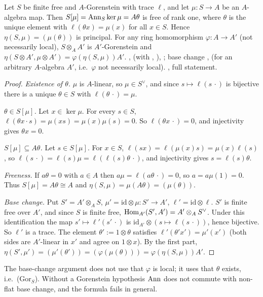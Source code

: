 \begin{lemma}\label{lem:s06-S}
Let $S$ be finite free and $A$-Gorenstein with trace $\ell$, and let $\mu:S\to A$ be an $A$-algebra map. Then
$S[\mu]=\operatorname{Ann}_S\ker\mu=A\theta$ is free of rank one, where $\theta$ is the unique element with $\ell(\theta x)=\mu(x)$ for all $x\in S$.
Hence $\eta(S,\mu)=(\mu(\theta))$ is principal. For any ring homomorphism $\varphi:A\to A'$ (not necessarily local), $S\otimes_AA'$ is $A'$-Gorenstein and
$\eta(S\otimes A',\mu\otimes A')=\varphi(\eta(S,\mu))A'$. \stproved{} ,
 (with , ), ;
base change , 
(for an arbitrary $A$-algebra $A'$, i.e.\ $\varphi$ not necessarily local). \stformalized{}, full statement.
\end{lemma}
\begin{proof}
\emph{Existence of $\theta$.} $\mu$ is $A$-linear, so $\mu\in S^\vee$, and since $s\mapsto\ell(s\,\cdot)$ is bijective there is a unique
$\theta\in S$ with $\ell(\theta\,\cdot)=\mu$.

\emph{$\theta\in S[\mu]$.} Let $x\in\ker\mu$. For every $s\in S$, $\ell(\theta x\cdot s)=\mu(xs)=\mu(x)\mu(s)=0$. So $\ell(\theta x\,\cdot)=0$,
and injectivity gives $\theta x=0$.

\emph{$S[\mu]\subseteq A\theta$.} Let $s\in S[\mu]$. For $x\in S$, $\ell(sx)=\ell(\mu(x)s)=\mu(x)\ell(s)$, so
$\ell(s\,\cdot)=\ell(s)\mu=\ell(\ell(s)\theta\,\cdot)$, and injectivity gives $s=\ell(s)\theta$.

\emph{Freeness.} If $a\theta=0$ with $a\in A$ then $a\mu=\ell(a\theta\,\cdot)=0$, so $a=a\mu(1)=0$. Thus $S[\mu]=A\theta\cong A$ and
$\eta(S,\mu)=\mu(A\theta)=(\mu(\theta))$.

\emph{Base change.} Put $S'=A'\otimes_AS$, $\mu'=\mathrm{id}\otimes\mu:S'\to A'$, $\ell'=\mathrm{id}\otimes\ell$. $S'$ is finite free over
$A'$, and since $S$ is finite free, $\operatorname{Hom}_{A'}(S',A')=A'\otimes_AS^\vee$. Under this identification the map $s'\mapsto\ell'(s'\,\cdot)$ is
$\mathrm{id}_{A'}\otimes(s\mapsto\ell(s\,\cdot))$, hence bijective. So $\ell'$ is a trace. The element $\theta':=1\otimes\theta$ satisfies
$\ell'(\theta'x')=\mu'(x')$ (both sides are $A'$-linear in $x'$ and agree on $1\otimes x$). By the first part,
$\eta(S',\mu')=(\mu'(\theta'))=(\varphi(\mu(\theta)))=\varphi(\eta(S,\mu))A'$.
\end{proof}
\noindent The base-change argument does not use that $\varphi$ is local; it uses that $\theta$ exists, i.e.\ (Gor$_S$). Without a
Gorenstein hypothesis $\operatorname{Ann}$ does not commute with non-flat base change, and the formula fails in general.

